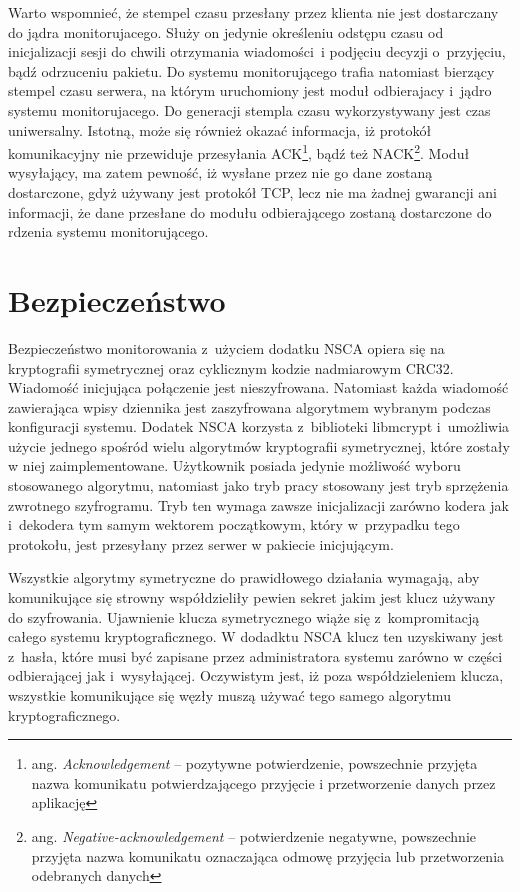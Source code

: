 Warto wspomnieć, że stempel czasu przesłany przez klienta nie jest
dostarczany do jądra monitorujacego. Służy on jedynie określeniu
odstępu czasu od inicjalizacji sesji do chwili otrzymania wiadomości~i
podjęciu decyzji o~przyjęciu, bądź odrzuceniu pakietu. Do systemu
monitorującego trafia natomiast bierzący stempel czasu serwera, na
którym uruchomiony jest moduł odbierajacy i~jądro systemu
monitorujacego. Do generacji stempla czasu wykorzystywany jest czas
uniwersalny. Istotną, może się również okazać informacja, iż protokół
komunikacyjny nie przewiduje przesyłania ACK\footnote {ang. {\em
    Acknowledgement} -- pozytywne potwierdzenie, powszechnie przyjęta
  nazwa komunikatu potwierdzającego przyjęcie i przetworzenie danych
  przez aplikację}, bądź też NACK\footnote{ang. {\em
    Negative-acknowledgement} -- potwierdzenie negatywne, powszechnie
  przyjęta nazwa komunikatu oznaczająca odmowę przyjęcia lub
  przetworzenia odebranych danych}. Moduł wysyłający, ma zatem
pewność, iż wysłane przez nie go dane zostaną dostarczone, gdyż
używany jest protokół TCP, lecz nie ma żadnej gwarancji ani
informacji, że dane przesłane do modułu odbierającego zostaną
dostarczone do rdzenia systemu monitorującego.

\section[Bezpieczeństwo][Bezpieczeństwo]{Bezpieczeństwo}

Bezpieczeństwo monitorowania z~użyciem dodatku NSCA opiera się na
kryptografii symetrycznej oraz cyklicznym kodzie nadmiarowym
CRC32. Wiadomość inicjująca połączenie jest nieszyfrowana. Natomiast
każda wiadomość zawierająca wpisy dziennika jest zaszyfrowana
algorytmem wybranym podczas konfiguracji systemu. Dodatek NSCA
korzysta z~biblioteki libmcrypt i~umożliwia użycie jednego spośród
wielu algorytmów kryptografii symetrycznej, które zostały w niej
zaimplementowane. Użytkownik posiada jedynie możliwość wyboru
stosowanego algorytmu, natomiast jako tryb pracy stosowany jest tryb
sprzężenia zwrotnego szyfrogramu. Tryb ten wymaga zawsze inicjalizacji
zarówno kodera jak i~dekodera tym samym wektorem początkowym, który
w~przypadku tego protokołu, jest przesyłany przez serwer w pakiecie
inicjującym.

Wszystkie algorytmy symetryczne do prawidłowego działania wymagają,
aby komunikujące się strowny współdzieliły pewien sekret jakim jest
klucz używany do szyfrowania. Ujawnienie klucza symetrycznego wiąże
się z~kompromitacją całego systemu kryptograficznego. W dodadktu NSCA
klucz ten uzyskiwany jest z~hasła, które musi być zapisane przez
administratora systemu zarówno w części odbierającej jak
i~wysyłającej. Oczywistym jest, iż poza współdzieleniem klucza,
wszystkie komunikujące się węzły muszą używać tego samego algorytmu
kryptograficznego.

